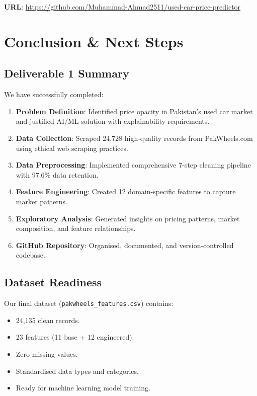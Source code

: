\documentclass[12pt,a4paper]{article}
\begin{document}
\textbf{URL}: \url{https://github.com/Muhammad-Ahmad2511/used-car-price-predictor}


\section{Conclusion \& Next Steps}

\subsection{Deliverable 1 Summary}

We have successfully completed:

\begin{enumerate}
    \item \textbf{Problem Definition}: Identified price opacity in Pakistan's used car market and justified AI/ML solution with explainability requirements.
    \item \textbf{Data Collection}: Scraped 24,728 high-quality records from PakWheels.com using ethical web scraping practices.
    \item \textbf{Data Preprocessing}: Implemented comprehensive 7-step cleaning pipeline with 97.6\% data retention.
    \item \textbf{Feature Engineering}: Created 12 domain-specific features to capture market patterns.
    \item \textbf{Exploratory Analysis}: Generated insights on pricing patterns, market composition, and feature relationships.
    \item \textbf{GitHub Repository}: Organised, documented, and version-controlled codebase.
\end{enumerate}

\subsection{Dataset Readiness}

Our final dataset (\texttt{pakwheels\_features.csv}) contains:
\begin{itemize}
    \item 24,135 clean records.
    \item 23 features (11 base + 12 engineered).
    \item Zero missing values.
    \item Standardised data types and categories.
    \item Ready for machine learning model training.
\end{itemize}
\end{document}
